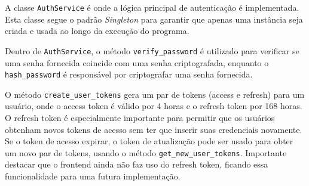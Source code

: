 A classe \texttt{AuthService} é onde a lógica principal de autenticação é implementada. Esta classe segue o padrão \textit{Singleton} para garantir que apenas uma instância seja criada e usada ao longo da execução do programa.

Dentro de \texttt{AuthService}, o método \texttt{verify\_password} é utilizado para verificar se uma senha fornecida coincide com uma senha criptografada, enquanto o \texttt{hash\_password} é responsável por criptografar uma senha fornecida.

O método \texttt{create\_user\_tokens} gera um par de tokens (access e refresh) para um usuário, onde o access token é válido por 4 horas e o refresh token por 168 horas. O refresh token é especialmente importante para permitir que os usuários obtenham novos tokens de acesso sem ter que inserir suas credenciais novamente. Se o token de acesso expirar, o token de atualização pode ser usado para obter um novo par de tokens, usando o método \texttt{get\_new\_user\_tokens}. Importante destacar que o frontend ainda não faz uso do refresh token, ficando essa funcionalidade para uma futura implementação.

